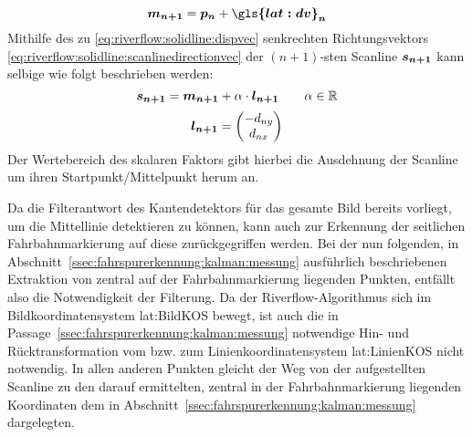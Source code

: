 \begin{equation}
\label{eq:riverflow:solidline:scanlinemidpoint}
\pnt{m_{n+1}} =  \pnt{p_n} + \vct{\gls{lat:dv}_n}
\end{equation}
Mithilfe des zu  \eqref{eq:riverflow:solidline:dispvec} senkrechten Richtungsvektors  \eqref{eq:riverflow:solidline:scanlinedirectionvec} der \begin{math} (n+1)\end{math}-sten  Scanline \begin{math} \boldsymbol{s_{n+1}} \end{math} kann selbige wie folgt beschrieben werden:
\begin{equation}
\label{eq:riverflow:solidline:scanlinecontinous}
\boldsymbol{s_{n+1}} =
\boldsymbol{m_{n+1}}  + \alpha \cdot \boldsymbol{l_{n+1}}
\qquad \alpha \in \mathbb{R}
\end{equation}
\begin{equation}
\label{eq:riverflow:solidline:scanlinedirectionvec}
\boldsymbol{l_{n+1}} =
\begin{pmatrix}
-d_{ny} \\
d_{nx}
\end{pmatrix}
\end{equation}
Der Wertebereich des skalaren Faktors \scl{\alpha} gibt hierbei die Ausdehnung der Scanline um ihren Startpunkt/Mittelpunkt  herum an.

Da die Filterantwort des Kantendetektors für das gesamte Bild bereits vorliegt, um die Mittellinie detektieren zu können, kann auch zur Erkennung der seitlichen Fahrbahnmarkierung auf diese zurückgegriffen werden. Bei der nun folgenden, in Abschnitt~\ref{ssec:fahrspurerkennung:kalman:messung} ausführlich beschriebenen Extraktion von zentral auf der Fahrbahnmarkierung liegenden Punkten, entfällt also die Notwendigkeit der Filterung. Da der Riverflow-Algorithmus sich im Bildkoordinatensystem \gls{lat:BildKOS} bewegt, ist auch die in Passage~\ref{ssec:fahrspurerkennung:kalman:messung} notwendige Hin- und Rücktransformation vom bzw. zum Linienkoordinatensystem \gls{lat:LinienKOS} nicht notwendig. In allen anderen Punkten gleicht der Weg von der aufgestellten Scanline  zu den darauf ermittelten, zentral in der Fahrbahnmarkierung liegenden Koordinaten  dem in Abschnitt~\ref{ssec:fahrspurerkennung:kalman:messung} dargelegten.

